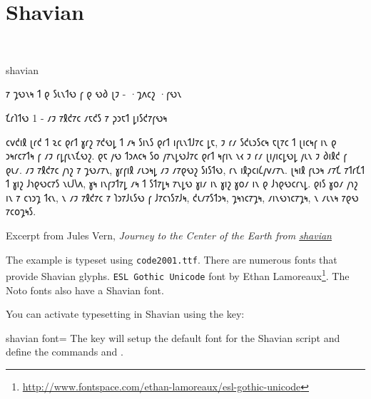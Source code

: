 \section{Shavian}
\label{s:shavian}
\def\shaviansetup#1{}
\newfontfamily{}
^^A\newfontfamily{}
\cxset{shavian font/.code=\shaviansetup{#1}}




\begin{scriptexample}[]{shavian}
\shavian

𐑳 𐑡𐑻𐑯𐑰 𐑑 𐑞 𐑕𐑧𐑯𐑑𐑻 𐑝 𐑞 𐑻𐑔
𐑚𐑲 - ·𐑡𐑵𐑤𐑟 ·𐑝𐑻𐑯

𐑗𐑩𐑐𐑑𐑻 1 - 𐑥𐑲 𐑳𐑙𐑒𐑳𐑤 𐑥𐑱𐑒𐑕 𐑳 𐑜𐑮𐑱𐑑 𐑛𐑦𐑕𐑒𐑳𐑝𐑻𐑰

     𐑤𐑫𐑒𐑦𐑙 𐑚𐑩𐑒 𐑑 𐑷𐑤 𐑞𐑩𐑑 𐑣𐑩𐑟 𐑳𐑒𐑻𐑛 𐑑 𐑥𐑰 𐑕𐑦𐑯𐑕 𐑞𐑩𐑑 𐑦𐑝𐑧𐑯𐑑𐑓𐑳𐑤 𐑛𐑱, 𐑲 𐑩𐑥 𐑕𐑒𐑧𐑮𐑕𐑤𐑰 𐑱𐑚𐑳𐑤 𐑑 𐑚𐑦𐑤𐑰𐑝 𐑦𐑯 𐑞 𐑮𐑰𐑩𐑤𐑳𐑑𐑰 𐑝 𐑥𐑲 𐑩𐑛𐑝𐑧𐑯𐑗𐑻𐑟. 𐑞𐑱 𐑢𐑻 𐑑𐑮𐑵𐑤𐑰 𐑕𐑴 𐑢𐑳𐑯𐑛𐑻𐑓𐑳𐑤 𐑞𐑩𐑑 𐑰𐑝𐑦𐑯 𐑯𐑬 𐑲 𐑩𐑥 𐑚𐑦𐑢𐑦𐑤𐑛𐑻𐑛 𐑢𐑧𐑯 𐑲 𐑔𐑦𐑙𐑒 𐑝 𐑞𐑧𐑥.
     𐑥𐑲 𐑳𐑙𐑒𐑳𐑤 𐑢𐑪𐑟 𐑳 𐑡𐑻𐑥𐑳𐑯, 𐑣𐑩𐑝𐑦𐑙 𐑥𐑧𐑮𐑰𐑛 𐑥𐑲 𐑥𐑳𐑞𐑻𐑟 𐑕𐑦𐑕𐑑𐑻, 𐑩𐑯 𐑦𐑙𐑜𐑤𐑦𐑖𐑢𐑫𐑥𐑳𐑯. 𐑚𐑰𐑦𐑙 𐑝𐑧𐑮𐑰 𐑥𐑳𐑗 𐑳𐑑𐑩𐑗𐑑 𐑑 𐑣𐑦𐑟 𐑓𐑪𐑞𐑻𐑤𐑳𐑕 𐑯𐑧𐑓𐑘𐑵, 𐑣𐑰 𐑦𐑯𐑝𐑲𐑑𐑳𐑛 𐑥𐑰 𐑑 𐑕𐑑𐑳𐑛𐑰 𐑳𐑯𐑛𐑻 𐑣𐑦𐑥 𐑦𐑯 𐑣𐑦𐑟 𐑣𐑴𐑥 𐑦𐑯 𐑞 𐑓𐑪𐑞𐑻𐑤𐑩𐑯𐑛. 𐑞𐑦𐑕 𐑣𐑴𐑥 𐑢𐑪𐑟 𐑦𐑯 𐑳 𐑤𐑪𐑮𐑡 𐑑𐑬𐑯, 𐑯 𐑥𐑲 𐑳𐑙𐑒𐑳𐑤 𐑳 𐑐𐑮𐑳𐑓𐑧𐑕𐑻 𐑝 𐑓𐑳𐑤𐑪𐑕𐑳𐑓𐑰, 𐑒𐑧𐑥𐑳𐑕𐑑𐑮𐑰, 𐑡𐑰𐑪𐑤𐑳𐑡𐑰, 𐑥𐑦𐑯𐑻𐑪𐑤𐑳𐑡𐑰, 𐑯 𐑥𐑧𐑯𐑰 𐑳𐑞𐑻 𐑳𐑤𐑴𐑡𐑰𐑕.

\arial

\hfill Excerpt from Jules Vern,  \textit{Journey to the Center of the Earth from \href{http://shavian.weebly.com/}{shavian}}
\end{scriptexample}

The example is typeset using \texttt{code2001.ttf}. There are numerous fonts that provide Shavian glyphs. \texttt{ESL Gothic Unicode} font by Ethan Lamoreaux\footnote{\url{http://www.fontspace.com/ethan-lamoreaux/esl-gothic-unicode}}. The Noto fonts also have a Shavian font. 

You can activate typesetting in Shavian using the key:

\begin{docKey}[phd]{shavian font}{= } {}
The key will setup the
default font for the Shavian script and define the commands \cmd{\shavian} and \cmd{\textshavian}. 
\end{docKey}






